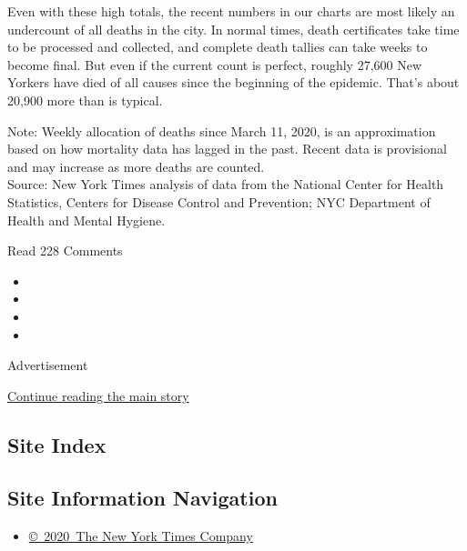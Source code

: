 Even with these high totals, the recent numbers in our charts are most
likely an undercount of all deaths in the city. In normal times, death
certificates take time to be processed and collected, and complete death
tallies can take weeks to become final. But even if the current count is
perfect, roughly 27,600 New Yorkers have died of all causes since the
beginning of the epidemic. That's about 20,900 more than is typical.

Note: Weekly allocation of deaths since March 11, 2020, is an
approximation based on how mortality data has lagged in the past. Recent
data is provisional and may increase as more deaths are counted.\\
Source: New York Times analysis of data from the National Center for
Health Statistics, Centers for Disease Control and Prevention; NYC
Department of Health and Mental Hygiene.

Read 228 Comments

\begin{itemize}
\item
\item
\item
\item
\end{itemize}

Advertisement

\protect\hyperlink{after-bottom}{Continue reading the main story}

\hypertarget{site-index}{%
\subsection{Site Index}\label{site-index}}

\hypertarget{site-information-navigation}{%
\subsection{Site Information
Navigation}\label{site-information-navigation}}

\begin{itemize}
\tightlist
\item
  \href{https://help.nytimes3xbfgragh.onion/hc/en-us/articles/115014792127-Copyright-notice}{©~2020~The
  New York Times Company}
\end{itemize}

